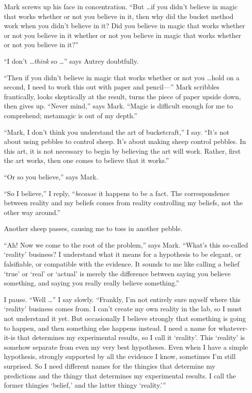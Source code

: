{
 Mark screws up his face in concentration. ``But
\ldots if you didn't believe in magic that works whether
or not you believe in it, then why did the bucket method work when you
didn't believe in it? Did you believe in magic that
works whether or not you believe in it whether or not you believe in
magic that works whether or not you believe in it?''}

{
 ``I don't \ldots \textit{think} so
\ldots'' says Autrey doubtfully.}

{
 ``Then if you didn't believe in
magic that works whether or not you \ldots hold on a second, I need to
work this out with paper and pencil---'' Mark
scribbles frantically, looks skeptically at the result, turns the piece
of paper upside down, then gives up. ``Never
mind,'' says Mark. ``Magic is
difficult enough for me to comprehend; metamagic is out of my
depth.''}

{
 ``Mark, I don't think you
understand the art of bucketcraft,'' I say.
``It's not about using pebbles to
control sheep. It's about making sheep control pebbles.
In this art, it is not necessary to begin by believing the art will
work. Rather, first the art works, then one comes to believe that it
works.''}

{
 ``Or so you believe,'' says
Mark.}

{
 ``So I believe,'' I reply,
``\textit{because} it happens to be a fact. The
correspondence between reality and my beliefs comes from reality
controlling my beliefs, not the other way around.''}

{
 Another sheep passes, causing me to toss in another pebble.}

{
 ``Ah! Now we come to the root of the
problem,'' says Mark.
``What's this so-called
`reality' business? I understand what it
means for a hypothesis to be elegant, or falsifiable, or compatible
with the evidence. It sounds to me like calling a belief
`true' or
`real' or
`actual' is merely the difference
between saying you believe something, and saying you really really
believe something.''}

{
 I pause. ``Well \ldots'' I say
slowly. ``Frankly, I'm not entirely
sure myself where this `reality'
business comes from. I can't create my own reality in
the lab, so I must not understand it yet. But occasionally I believe
strongly that something is going to happen, and then something else
happens instead. I need a name for whatever-it-is that determines my
experimental results, so I call it
`reality'. This
`reality' is somehow separate from even
my very best hypotheses. Even when I have a simple hypothesis, strongly
supported by all the evidence I know, sometimes I'm
still surprised. So I need different names for the thingies that
determine my predictions and the thingy that determines my experimental
results. I call the former thingies
`belief,' and the latter thingy
`reality.'''}

